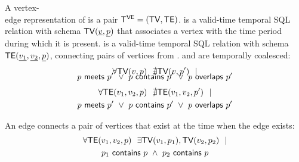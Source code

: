 
\vspace{-0.2cm}
\begin{definition}
A vertex-\\edge representation of \tg is a pair $\mathsf{T^{VE}}=(\textsf{TV}, \textsf{TE})$. \tv
is a valid-time temporal SQL relation with schema $\textsf{TV}(\underline{v},
\underline{p})$ that associates a vertex with the time period during
which it is present. \te is a valid-time temporal SQL relation with
schema $\textsf{TE}(\underline{v_1}, \underline{v_2}, \underline{p})$,
connecting pairs of vertices from \tv. \tv and \te are
temporally coalesced:
\vspace{-0.3cm}
\begin{multline}
\vspace{-0.3cm}
\forall \tv(v, p)~~\nexists \tv(v, p')~~| \\
                       \pred{p}{meets}{p'}~\lor~\pred{p}{contains}{p'}~\lor~\pred{p}{overlaps}{p'}
\label{def:tg:c2}
\end{multline}
\vspace{-0.7cm}
\begin{multline}
\forall \textsf{TE}(v_1, v_2, p)~~\nexists \textsf{TE}(v_1,v_2, p')~~| \\
                       p~\mathsf{meets}~p'~\lor~p~\mathsf{contains}~p'~\lor~p~\mathsf{overlaps}~p'
\label{def:tg:c3}
\end{multline}

An edge connects a pair of vertices that exist at the time when the edge exists:
\vspace{-0.3cm}
\begin{multline}
\forall \textsf{TE}(v_1, v_2, p)~~\exists \textsf{TV}(v_1, p_1), \textsf{TV}(v_2, p_2)~~| \\
                       p_1~\mathsf{contains}~p~\wedge~p_2~\mathsf{contains}~p
\label{def:tg:c1}
\end{multline}
\vspace{-0.5cm}


\end{definition}

